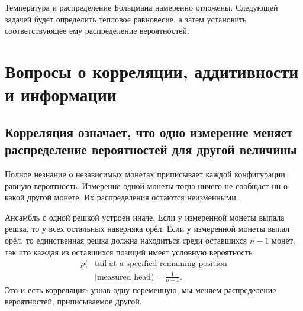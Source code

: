 \begin{classroomqa}
\end{classroomqa}

Температура и распределение Больцмана намеренно отложены. Следующей задачей будет определить тепловое равновесие, а затем установить соответствующее ему распределение вероятностей.

\section{Вопросы о корреляции, аддитивности и информации}

\subsection{Корреляция означает, что одно измерение меняет распределение вероятностей для другой величины}

Полное незнание о независимых монетах приписывает каждой конфигурации равную вероятность. Измерение одной монеты тогда ничего не сообщает ни о какой другой монете. Их распределения остаются неизменными.

Ансамбль с одной решкой устроен иначе. Если у измеренной монеты выпала решка, то у всех остальных наверняка орёл. Если у измеренной монеты выпал орёл, то единственная решка должна находиться среди оставшихся \(n-1\) монет, так что каждая из оставшихся позиций имеет условную вероятность
\begin{equation}
\begin{aligned}
 p(&\text{tail at a specified remaining position}\\
   &\mid\text{measured head})=\frac{1}{n-1}.
\end{aligned}
 \label{eq:sm1-conditional-tail}
\end{equation}
Это и есть корреляция: узнав одну переменную, мы меняем распределение вероятностей, приписываемое другой.

\begin{classroomqa}
\end{classroomqa}

